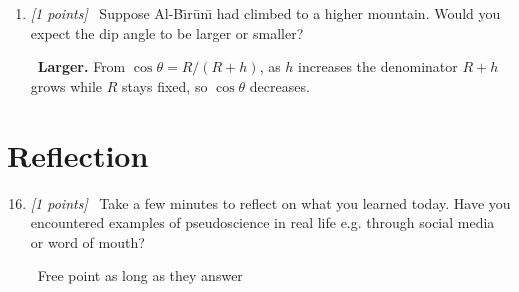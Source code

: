 \documentclass[11pt]{article}
\newcommand{\pts}[1]{\textit{[#1 points]}\ }
\newcommand{\ans}[1]{%
  \par\smallskip\noindent{\color{blue!55!black}\textbf{Answer:}}\ #1\par\smallskip}
\begin{document}
\begin{enumerate}
{    For $\theta = 0.57^\circ$:
\[
\cos(0.57^\circ) \approx 0.999951 \quad \implies \quad 1 - \cos(0.57^\circ) \approx 0.0000495
\]
\[
R = \frac{305 \times 0.999951}{0.0000495} \approx 6,163,000 \text{ m} \approx \mathbf{6,163 \text{ km}}
\]. This is within about 3\% of the
    accepted 6,371~km.}



    \item \pts{1} Suppose Al-B\={\i}r\=un\={\i} had climbed to a higher
    mountain. Would you expect the dip angle to be larger or smaller?

    \ans{\textbf{Larger.} From $\cos\theta = R/(R+h)$, as $h$ increases the
    denominator $R+h$ grows while $R$ stays fixed, so $\cos\theta$
    decreases. }
\end{enumerate}



\section{Reflection}
\begin{enumerate}
    \setcounter{enumi}{15}
    \item \pts{1} Take a few minutes to reflect on what you learned today. Have you encountered examples of pseudoscience in real life e.g. through social media or word of mouth?

    \ans{Free point as long as they answer}

\end{enumerate}
\end{document}

